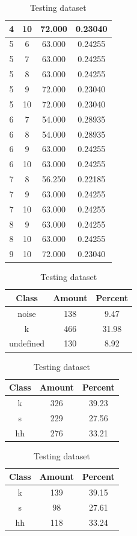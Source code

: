 \begin{table}
\begin{subtable}[h]{0.45\textwidth}
{\begin{tabular}{|c|c|c|c|}
 4 & 10 & 72.000 & 0.23040\\ \hline 
 5 & 6 & 63.000 & 0.24255\\ \hline 
 5 & 7 & 63.000 & 0.24255\\ \hline 
 5 & 8 & 63.000 & 0.24255\\ \hline 
 5 & 9 & 72.000 & 0.23040\\ \hline 
 5 & 10 & 72.000 & 0.23040\\ \hline 
 6 & 7 & 54.000 & 0.28935\\ \hline 
 6 & 8 & 54.000 & 0.28935\\ \hline 
 6 & 9 & 63.000 & 0.24255\\ \hline 
 6 & 10 & 63.000 & 0.24255\\ \hline 
 7 & 8 & 56.250 & 0.22185\\ \hline 
 7 & 9 & 63.000 & 0.24255\\ \hline 
 7 & 10 & 63.000 & 0.24255\\ \hline 
 8 & 9 & 63.000 & 0.24255\\ \hline 
 8 & 10 & 63.000 & 0.24255\\ \hline 
 9 & 10 & 72.000 & 0.23040\\ \hline 

\end{tabular}
}\label{xlsflux105}
\caption{xcsflux105}
\end{subtable}

\begin{subtable}[h]{0.45\textwidth}
\centering
\begin{tabular}{|c|c|c|}
\hline
Class & Amount & Percent\\ \hline
noise & 138 & 9.47\\ \hline
k & 466 & 31.98\\ \hline
undefined & 130 & 8.92\\ \hline
\end{tabular}
\caption{Entire dataset after stripping short sounds}
\end{subtable}
\hfill
\begin{subtable}[h]{0.45\textwidth}
\centering
\begin{tabular}{|c|c|c|}
\hline
Class & Amount & Percent\\ \hline
k & 326 & 39.23\\ \hline
s & 229 & 27.56\\ \hline
hh & 276 & 33.21\\ \hline
\end{tabular}
\caption{Training dataset}
\end{subtable}
\hfill
\begin{subtable}[h]{0.45\textwidth}
\centering
\begin{tabular}{|c|c|c|}
\hline
Class & Amount & Percent\\ \hline
k & 139 & 39.15\\ \hline
s & 98 & 27.61\\ \hline
hh & 118 & 33.24\\ \hline
\end{tabular}
\caption{Testing dataset}
\end{subtable}
\hfill


\end{table}
